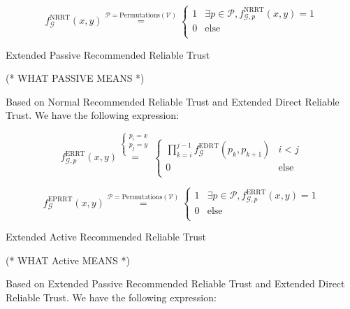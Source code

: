 \documentclass{article}
\begin{document}
\begin{equation}
f_{\mathcal{G}}^{\text{NRRT}}(x,y)\overset{\mathcal{P}=\text{Permutations}(\mathcal{V})}{=}\left\{
\begin{array}{cc}
 1 & \exists \mathit{p}\in \mathcal{P},f_{\mathcal{G},\mathit{p}}^{\text{NRRT}}(x,y)=1 \\
 0 & \text{else} \\
\end{array}
\right.
\end{equation}

Extended Passive Recommended Reliable Trust

(* WHAT PASSIVE MEANS *)

Based on Normal Recommended Reliable Trust and Extended Direct Reliable Trust. We have the following expression:

\begin{equation}
f_{\mathcal{G},\mathit{p}}^{\text{ERRT}}(x,y)\overset{\left\{
\begin{array}{c}
 \mathit{p}_i=x \\
 \mathit{p}_j=y \\
\end{array}
\right.}{=}\left\{
\begin{array}{cc}
 \prod _{k=i}^{j-1} f_{\mathcal{G}}^{\text{EDRT}}\left(\mathit{p}_k,p_{k+1}\right) & i<j \\
 0 & \text{else} \\
\end{array}
\right.
\end{equation}

\begin{equation}
f_{\mathcal{G}}^{\text{EPRRT}}(x,y)\overset{\mathcal{P}=\text{Permutations}(\mathcal{V})}{=}\left\{
\begin{array}{cc}
 1 & \exists \mathit{p}\in \mathcal{P},f_{\mathcal{G},\mathit{p}}^{\text{ERRT}}(x,y)=1 \\
 0 & \text{else} \\
\end{array}
\right.
\end{equation}

Extended Active Recommended Reliable Trust

(* WHAT Active MEANS *)

Based on Extended Passive Recommended Reliable Trust and Extended Direct Reliable Trust. We have the following expression:
\end{document}
